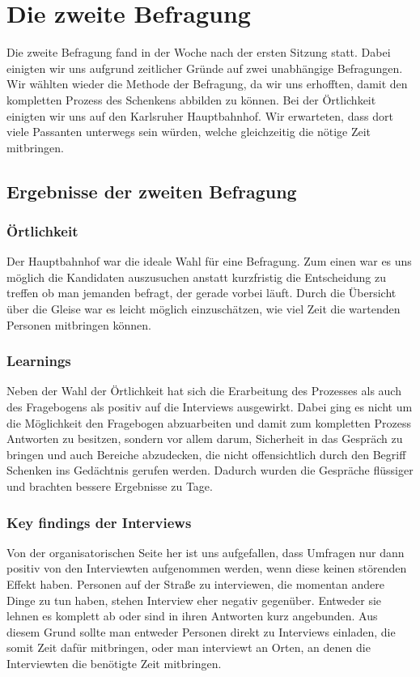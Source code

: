 \documentclass[12pt,ngerman, fleqn]{book} %
\begin{document}
\section{Die zweite Befragung}
Die zweite Befragung fand in der Woche nach der ersten Sitzung statt. Dabei einigten wir uns aufgrund zeitlicher Gründe auf zwei unabhängige Befragungen. Wir wählten wieder die Methode der Befragung, da wir uns erhofften, damit den kompletten Prozess des Schenkens abbilden zu können. Bei der Örtlichkeit einigten wir uns auf den Karlsruher Hauptbahnhof. Wir erwarteten, dass dort viele Passanten unterwegs sein würden, welche gleichzeitig die nötige Zeit mitbringen.

\subsection{Ergebnisse der zweiten Befragung}
\subsubsection{Örtlichkeit}
Der Hauptbahnhof war die ideale Wahl für eine Befragung. Zum einen war es uns möglich die Kandidaten auszusuchen anstatt kurzfristig die Entscheidung zu treffen ob man jemanden befragt, der gerade vorbei läuft. Durch die Übersicht über die Gleise war es leicht möglich einzuschätzen, wie viel Zeit die wartenden Personen mitbringen können.

\subsubsection{Learnings}
Neben der Wahl der Örtlichkeit hat sich die Erarbeitung des Prozesses als auch des Fragebogens als positiv auf die Interviews ausgewirkt. Dabei ging es nicht um die Möglichkeit den Fragebogen abzuarbeiten und damit zum kompletten Prozess Antworten zu besitzen, sondern vor allem darum, Sicherheit in das Gespräch zu bringen und auch Bereiche abzudecken, die nicht offensichtlich durch den Begriff Schenken ins Gedächtnis gerufen werden. Dadurch wurden die Gespräche flüssiger und brachten bessere Ergebnisse zu Tage.

\subsubsection{Key findings der Interviews}
Von der organisatorischen Seite her ist uns aufgefallen, dass Umfragen nur dann positiv von den Interviewten aufgenommen werden, wenn diese keinen störenden Effekt haben. Personen auf der Straße zu interviewen, die momentan andere Dinge zu tun haben, stehen Interview eher negativ gegenüber. Entweder sie lehnen es komplett ab oder sind in ihren Antworten kurz angebunden. Aus diesem Grund sollte man entweder Personen direkt zu Interviews einladen, die somit Zeit dafür mitbringen, oder man interviewt an Orten, an denen die Interviewten die benötigte Zeit mitbringen.\\
\end{document}
